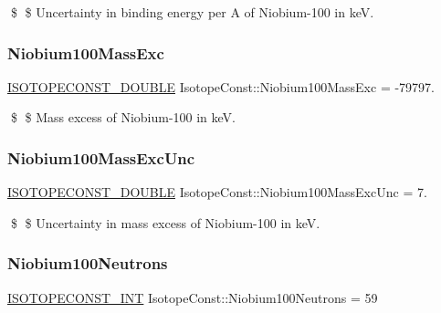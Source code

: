 \$ \$ Uncertainty in binding energy per A of Niobium-\/100 in keV. \mbox{\label{group___isotope_const-_niobium-_nb100_gab59a88dc40d7d02b48808904cb242cb8}} 
\subsubsection{\texorpdfstring{Niobium100\+Mass\+Exc}{Niobium100MassExc}}
{\footnotesize\ttfamily \mbox{\hyperlink{group___isotope_const-_macros_ga8f45a7272ce02c0b4c65c44636ed719a}{I\+S\+O\+T\+O\+P\+E\+C\+O\+N\+S\+T\+\_\+\+D\+O\+U\+B\+LE}} Isotope\+Const\+::\+Niobium100\+Mass\+Exc = -\/79797.}

\$ \$ Mass excess of Niobium-\/100 in keV. \mbox{\label{group___isotope_const-_niobium-_nb100_ga4f0912a9880defdcc67cbdabfd83627a}} 
\subsubsection{\texorpdfstring{Niobium100\+Mass\+Exc\+Unc}{Niobium100MassExcUnc}}
{\footnotesize\ttfamily \mbox{\hyperlink{group___isotope_const-_macros_ga8f45a7272ce02c0b4c65c44636ed719a}{I\+S\+O\+T\+O\+P\+E\+C\+O\+N\+S\+T\+\_\+\+D\+O\+U\+B\+LE}} Isotope\+Const\+::\+Niobium100\+Mass\+Exc\+Unc = 7.}

\$ \$ Uncertainty in mass excess of Niobium-\/100 in keV. \mbox{\label{group___isotope_const-_niobium-_nb100_gadea850b9ef9d32a05fae867ea3952dc7}} 
\subsubsection{\texorpdfstring{Niobium100\+Neutrons}{Niobium100Neutrons}}
{\footnotesize\ttfamily \mbox{\hyperlink{group___isotope_const-_macros_ga5f18360b3e99483a35c32d789e62621c}{I\+S\+O\+T\+O\+P\+E\+C\+O\+N\+S\+T\+\_\+\+I\+NT}} Isotope\+Const\+::\+Niobium100\+Neutrons = 59}


